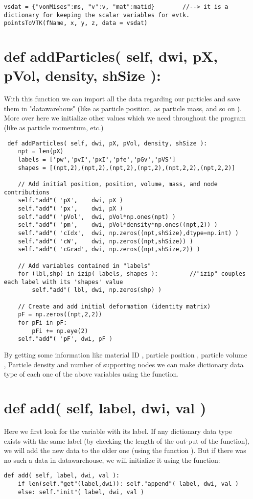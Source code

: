 \documentclass[11pt,fleqn]{book} %
\begin{document}
\begin{lstlisting}
vsdat = {"vonMises":ms, "v":v, "mat":matid}        //--> it is a dictionary for keeping the scalar variables for evtk.
pointsToVTK(fName, x, y, z, data = vsdat)
\end{lstlisting}

\section{def addParticles( self, dwi, pX, pVol, density, shSize ):}
With this function we can import all the data regarding our particles and save them in "datawarehous" (like  as particle position,  as particle mass, and so on ). More over here we initialize other values which we need throughout the program (like  as particle momentum, etc.)
\begin{lstlisting} 
 def addParticles( self, dwi, pX, pVol, density, shSize ):
	npt = len(pX)
	labels = ['pw','pvI','pxI','pfe','pGv','pVS']
	shapes = [(npt,2),(npt,2),(npt,2),(npt,2),(npt,2,2),(npt,2,2)]

	// Add initial position, position, volume, mass, and node contributions
	self."add"( 'pX',    dwi, pX )
	self."add"( 'px',    dwi, pX )
	self."add"( 'pVol',  dwi, pVol*np.ones(npt) )
	self."add"( 'pm',    dwi, pVol*density*np.ones((npt,2)) )             
	self."add"( 'cIdx',  dwi, np.zeros((npt,shSize),dtype=np.int) )
	self."add"( 'cW',    dwi, np.zeros((npt,shSize)) )
	self."add"( 'cGrad', dwi, np.zeros((npt,shSize,2)) )		

	// Add variables contained in "labels"
	for (lbl,shp) in izip( labels, shapes ):         //"izip" couples each label with its 'shapes' value
	    self."add"( lbl, dwi, np.zeros(shp) )
	
	// Create and add initial deformation (identity matrix)
	pF = np.zeros((npt,2,2))
	for pFi in pF:
	    pFi += np.eye(2)
	self."add"( 'pF', dwi, pF )
\end{lstlisting}
By getting some information like material ID , particle position , particle volume , Particle density  and number of supporting nodes  we can make dictionary data type of each one of the above variables using the {} function.
\section{ def add( self, label, dwi, val )}
Here we first look for the variable with its label. If any dictionary data type exists with the same label (by checking the length of the out-put of the {} function), we will add the new data to the older one (using the {} function ). But if there was no such a data in datawarehouse, we will initialize it using the {} function:
\begin{lstlisting}
def add( self, label, dwi, val ):
	if len(self."get"(label,dwi)): self."append"( label, dwi, val )
	else: self."init"( label, dwi, val )
\end{lstlisting}
\end{document}
